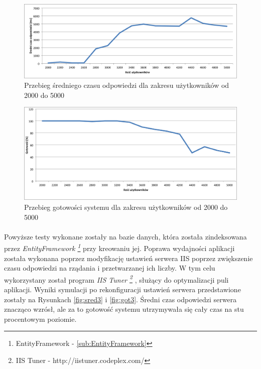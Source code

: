 \begin{figure}[ht]
	\centering
		\includegraphics[width=1\linewidth]{assets/sredni2.png}
		\caption{Przebieg średniego czasu odpowiedzi dla zakresu użytkowników od 2000 do 5000}
	\label{fig:sred2}
\end{figure}

\begin{figure}[ht]
	\centering
		\includegraphics[width=1\linewidth]{assets/gotowosc2.png}
		\caption{Przebieg gotowości systemu dla zakresu użytkowników od 2000 do 5000}
	\label{fig:got2}
\end{figure}

\paragraph{} %
\label{par:}
Powyższe testy wykonane zostały na bazie danych, która została zindeksowana przez \textit{EntityFramework \footnote{EntityFramework - \ref{sub:EntityFramework}}} przy kreowaniu jej. Poprawa wydajności aplikacji została wykonana poprzez modyfikację ustawień serwera IIS poprzez zwiększenie czasu odpowiedzi na rządania i przetwarzanej ich liczby. W tym celu wykorzystany został program \textit{IIS Tuner \footnote{IIS Tuner - http://iistuner.codeplex.com/}} , służący do optymalizacji puli aplikacji. Wyniki symulacji po rekonfiguracji ustawień serwera przedstawione zostały na Rysunkach \ref{fig:sred3} i \ref{fig:got3}. Średni czas odpowiedzi serwera znacząco wzrósł, ale za to gotowość systemu utrzymywała się cały czas na stu procentowym poziomie.

